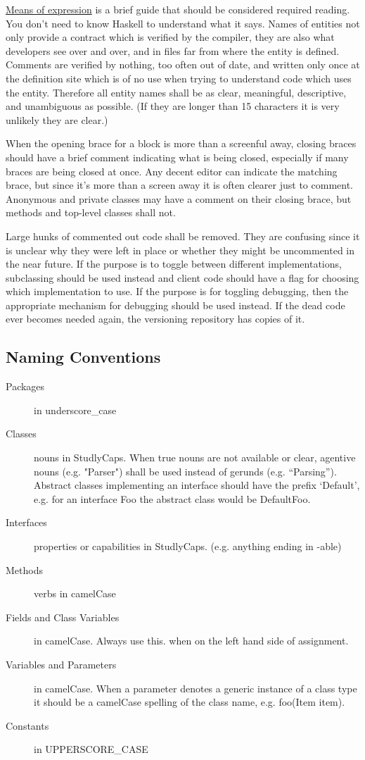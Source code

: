 \href{http://www.haskell.org/haskellwiki/Means_of_expression}{Means of expression} is a brief guide that should be considered required reading. You don't need to know Haskell to understand what it says. Names of entities not only provide a contract which is verified by the compiler, they are also what developers see over and over, and in files far from where the entity is defined. Comments are verified by nothing, too often out of date, and written only once at the definition site which is of no use when trying to understand code which uses the entity. Therefore all entity names shall be as clear, meaningful, descriptive, and unambiguous as possible. (If they are longer than 15 characters it is very unlikely they are clear.)

When the opening brace for a block is more than a screenful away, closing braces should have a brief comment indicating what is being closed, especially if many braces are being closed at once. Any decent editor can indicate the matching brace, but since it's more than a screen away it is often clearer just to comment. Anonymous and private classes may have a comment on their closing brace, but methods and top-level classes shall not.

Large hunks of commented out code shall be removed. They are confusing since it is unclear why they were left in place or whether they might be uncommented in the near future. If the purpose is to toggle between different implementations, subclassing should be used instead and client code should have a flag for choosing which implementation to use. If the purpose is for toggling debugging, then the appropriate mechanism for debugging should be used instead. If the dead code ever becomes needed again, the versioning repository has copies of it. 



\subsection{Naming Conventions}

\begin{description}
\item[Packages] in underscore\_case
\item[Classes] nouns in StudlyCaps. When true nouns are not available or clear, agentive nouns (e.g. "Parser") shall be used instead of gerunds (e.g. ``Parsing''). Abstract classes implementing an interface should have the prefix `Default', e.g. for an interface Foo the abstract class would be DefaultFoo.
\item[Interfaces] properties or capabilities in StudlyCaps. (e.g. anything ending in -able)
\item[Methods] verbs in camelCase
\item[Fields and Class Variables] in camelCase. Always use this. when on the left hand side of assignment.
\item[Variables and Parameters] in camelCase. When a parameter denotes a generic instance of a class type it should be a camelCase spelling of the class name, e.g. foo(Item item).
\item[Constants] in UPPERSCORE\_CASE 
\end{description}

